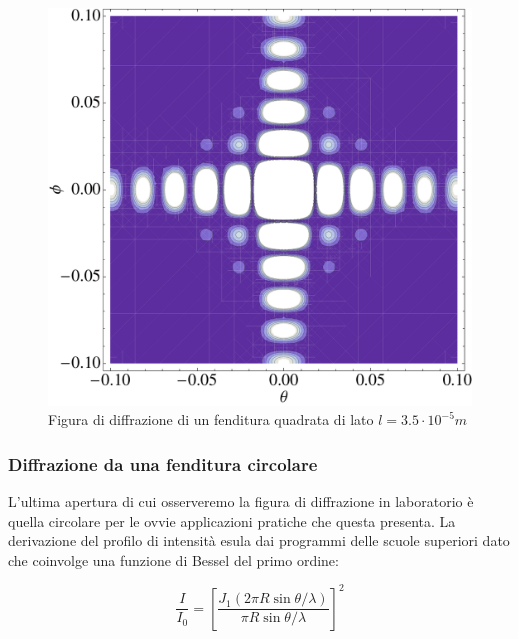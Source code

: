 \documentclass[a4paper,10pt,oneside]{article}
\begin{document}
\begin{figure}[H]
 \centering
 \includegraphics[width=\textwidth]{./Immagini/diffrazione3.pdf}
 \caption{Figura di diffrazione di un fenditura quadrata di lato $l=3.5\cdot 10^{-5}m$}
 \label{fig:diffrazione3}
\end{figure}




\subsubsection*{Diffrazione da una fenditura circolare}


L'ultima apertura di cui osserveremo la figura di diffrazione in laboratorio è quella circolare per le ovvie applicazioni pratiche che questa presenta. La derivazione del profilo di intensità esula dai programmi delle scuole superiori dato che coinvolge una funzione di Bessel del primo ordine:

\begin{equation}
 \frac{I}{I_0}=\left[\frac{J_1(2\pi R\sin\theta/\lambda)}{\pi R \sin\theta/\lambda}\right]^2
\end{equation}
\end{document}
